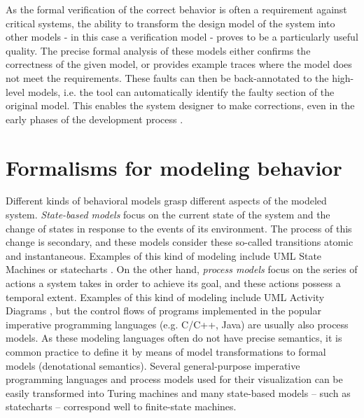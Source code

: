 As the formal verification of the correct behavior is often a requirement against critical systems, the ability to transform the design model of the system into other models - in this case a verification model - proves to be a particularly useful quality. The precise formal analysis of these models either confirms the correctness of the given model, or provides example traces where the model does not meet the requirements. These faults can then be back-annotated to the high-level models, i.e. the tool can automatically identify the faulty section of the original model. This enables the system designer to make corrections, even in the early phases of the development process \cite{RoadToModelTransf}.

\section{Formalisms for modeling behavior} \label{section_background_behaviorModeling}

Different kinds of behavioral models grasp different aspects of the modeled system. \textit{State-based models} focus on the current state of the system and the change of states in response to the events of its environment. The process of this change is secondary, and these models consider these so-called transitions atomic and instantaneous. Examples of this kind of modeling include UML State Machines \cite{UMLStandard251} or statecharts \cite{HarelStatechart87}. On the other hand, \textit{process models} focus on the series of actions a system takes in order to achieve its goal, and these actions possess a temporal extent. Examples of this kind of modeling include UML Activity Diagrams \cite{UMLStandard251}, but the control flows of programs implemented in the popular imperative programming languages (e.g. C/C++, Java) are usually also process models. As these modeling languages often do not have precise semantics, it is common practice to define it by means of model transformations to formal models (denotational semantics). Several general-purpose imperative programming languages and process models used for their visualization can be easily transformed into Turing machines and many state-based models -- such as statecharts -- correspond well to finite-state machines.

